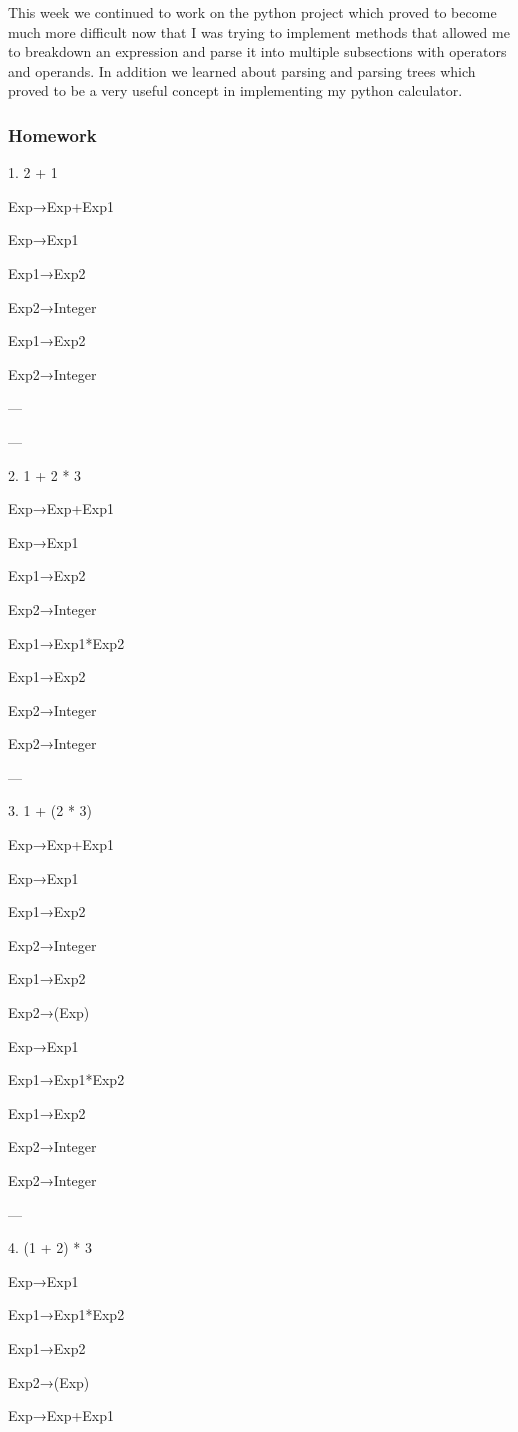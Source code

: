 \documentclass{article}
\theoremstyle{theorem}
\theoremstyle{definition}
\theoremstyle{remark}
\begin{document}
This week we continued to work on the python project which proved to become much more difficult now that I was trying to implement methods that allowed me to breakdown an expression and parse it into multiple subsections with operators and operands.
In addition we learned about parsing and parsing trees which proved to be a very useful concept in implementing my python calculator.

\subsubsection*{Homework}

1. 2 + 1

Exp→Exp+Exp1

Exp→Exp1

Exp1→Exp2

Exp2→Integer

Exp1→Exp2

Exp2→Integer

---

---

2. 1 + 2 * 3

Exp→Exp+Exp1

Exp→Exp1

Exp1→Exp2

Exp2→Integer

Exp1→Exp1*Exp2

Exp1→Exp2

Exp2→Integer

Exp2→Integer

---

3. 1 + (2 * 3)

Exp→Exp+Exp1

Exp→Exp1

Exp1→Exp2

Exp2→Integer

Exp1→Exp2

Exp2→(Exp)

Exp→Exp1

Exp1→Exp1*Exp2

Exp1→Exp2

Exp2→Integer

Exp2→Integer

---

4. (1 + 2) * 3

Exp→Exp1

Exp1→Exp1*Exp2

Exp1→Exp2

Exp2→(Exp)

Exp→Exp+Exp1
\end{document}
